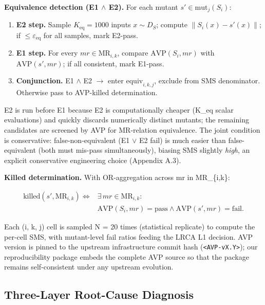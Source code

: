 \documentclass[12pt]{article}
\providecommand{\tightlist}{\setlength{\itemsep}{0pt}\setlength{\parskip}{0pt}}
\begin{document}
\textbf{Equivalence detection (E1 $\wedge$ E2).} For each mutant
$s' \in \mathrm{mut}_j(S_i)$:

\begin{enumerate}
\tightlist
\item
  \textbf{E2 step.} Sample $K_{\mathrm{eq}} = 1000$ inputs
  $x \sim D_S$; compute
  $\|S_i(x) - s'(x)\|$; if $\leq \varepsilon_{\mathrm{eq}}$ for all
  samples, mark E2-pass.
\item
  \textbf{E1 step.} For every $mr \in \mathrm{MR}_{i,k}$, compare
  $\mathrm{AVP}(S_i, mr)$ with $\mathrm{AVP}(s', mr)$;
  if all consistent, mark E1-pass.
\item
  \textbf{Conjunction.} E1 $\wedge$ E2 $\to$ enter $\mathrm{equiv}_{i,k,j}$,
  exclude from SMS denominator. Otherwise pass to AVP-killed
  determination.
\end{enumerate}

E2 is run before E1 because E2 is computationally cheaper (K\_eq scalar
evaluations) and quickly discards numerically distinct mutants; the
remaining candidates are screened by AVP for MR-relation equivalence.
The joint condition is conservative: false-non-equivalent (E1 $\vee$ E2 fail)
is much easier than false-equivalent (both must mis-pass
simultaneously), biasing SMS slightly \emph{high}, an explicit
conservative engineering choice (Appendix A.3).

\textbf{Killed determination.} With OR-aggregation across mr in
MR\_\{i,k\}:

\[
\begin{aligned}
\mathrm{killed}(s', \mathrm{MR}_{i,k}) \iff{} & \exists\,mr \in \mathrm{MR}_{i,k}: \\
& \mathrm{AVP}(S_i, mr) = \text{pass} \wedge
  \mathrm{AVP}(s', mr) = \text{fail}.
\end{aligned}
\]

Each (i, k, j) cell is sampled N = 20 times (statistical replicate) to
compute the per-cell SMS, with mutant-level fail ratios feeding the LRCA
L1 decision. AVP version is pinned to the upstream infrastructure commit hash
(\texttt{\textless{}AVP-vX.Y\textgreater{}}); our reproducibility
package embeds the complete AVP source so that the package remains
self-consistent under any upstream evolution.

\subsection{Three-Layer Root-Cause Diagnosis}\label{lrca-three-layer-diagnosis}
\end{document}
